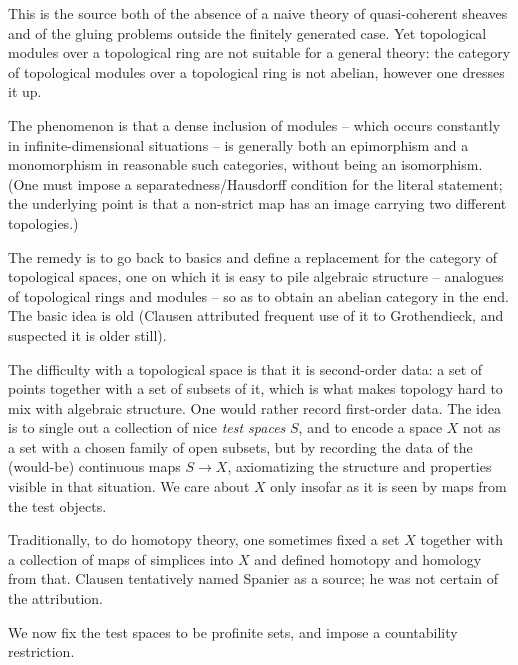This is the source both of the absence of a naive theory of quasi-coherent
sheaves and of the gluing problems outside the finitely generated case. Yet
topological modules over a topological ring are not suitable for a general
theory: the category of topological modules over a topological ring is not
abelian, however one dresses it up.

\begin{remark}
\label{rmk:1:not-abelian}
The phenomenon is that a dense inclusion of modules -- which occurs constantly
in infinite-dimensional situations -- is generally both an epimorphism and a
monomorphism in reasonable such categories, without being an isomorphism. (One
must impose a separatedness/Hausdorff condition for the literal statement; the
underlying point is that a non-strict map has an image carrying two different
topologies.)
\end{remark}

The remedy is to go back to basics and define a replacement for the category of
topological spaces, one on which it is easy to pile algebraic structure --
analogues of topological rings and modules -- so as to obtain an abelian
category in the end. The basic idea is old (Clausen attributed frequent use of it
to Grothendieck, and suspected it is older still).

The difficulty with a topological space is that it is second-order data: a set of
points together with a set of subsets of it, which is what makes topology hard to
mix with algebraic structure. One would rather record first-order data. The idea
is to single out a collection of nice \emph{test spaces} $S$, and to encode a
space $X$ not as a set with a chosen family of open subsets, but by recording the
data of the (would-be) continuous maps $S\to X$, axiomatizing the structure and
properties visible in that situation. We care about $X$ only insofar as it is
seen by maps from the test objects.

\begin{remark}
\label{rmk:1:older-incarnations}
Traditionally, to do homotopy theory, one sometimes fixed a set $X$ together with
a collection of maps of simplices into $X$ and defined homotopy and homology from
that. Clausen tentatively named Spanier as a source; he was not certain of the
attribution.
\end{remark}

We now fix the test spaces to be profinite sets, and impose a countability
restriction.


